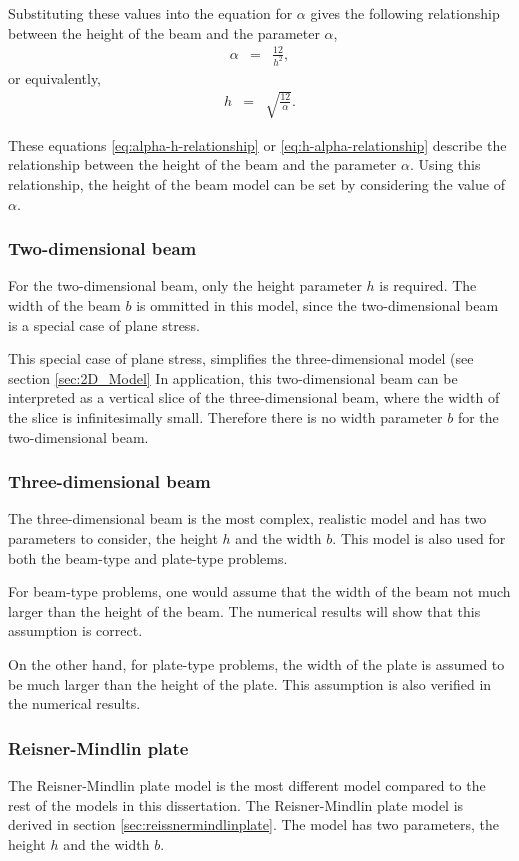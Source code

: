 \documentclass[../../main.tex]{subfiles}
\begin{document}
Substituting these values into the equation for $\alpha$ gives the following relationship between the height of the beam and the parameter $\alpha$,
\begin{eqnarray}
	\alpha & = & \frac{12}{h^2}, \label{eq:alpha-h-relationship}
\end{eqnarray}
or equivalently,
\begin{eqnarray}
	h & = & \sqrt{\frac{12}{\alpha}}. \label{eq:h-alpha-relationship}
\end{eqnarray}

These equations \eqref{eq:alpha-h-relationship} or \eqref{eq:h-alpha-relationship} describe the relationship between the height of the beam and the parameter $\alpha$. Using this relationship, the height of the beam model can be set by considering the value of $\alpha$.

\subsubsection{Two-dimensional beam}

For the two-dimensional beam, only the height parameter $h$ is required. The width of the beam $b$ is ommitted in this model, since the two-dimensional beam is a special case of plane stress.

This special case of plane stress, simplifies the three-dimensional model (see section \ref{sec:2D_Model} In application, this two-dimensional beam can be interpreted as a vertical slice of the three-dimensional beam, where the width of the slice is infinitesimally small. Therefore there is no width parameter $b$ for the two-dimensional beam.

\subsubsection{Three-dimensional beam}

The three-dimensional beam is the most complex, realistic model and has two parameters to consider, the height $h$ and the width $b$. This model is also used for both the beam-type and plate-type problems.

For beam-type problems, one would assume that the width of the beam not much larger than the height of the beam. The numerical results will show that this assumption is correct.

On the other hand, for plate-type problems, the width of the plate is assumed to be much larger than the height of the plate. This assumption is also verified in the numerical results.

\subsubsection{Reisner-Mindlin plate}
The Reisner-Mindlin plate model is the most different model compared to the rest of the models in this dissertation. The Reisner-Mindlin plate model is derived in section \ref{sec:reissnermindlinplate}. The model has two parameters, the height $h$ and the width $b$.
\end{document}
